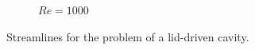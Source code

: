 \begin{figure}[H]
\begin{subfigure}[t]{0.438\textwidth}
        \caption*{$Re = 1000$ \parencite{ghia_1982}}
    \end{subfigure}
    \caption[Streamline results]{Streamlines for the problem of a lid-driven cavity.}
    \label{fig:cavity_streamline}
\end{figure}
